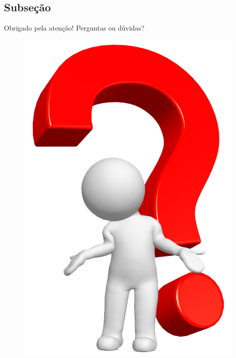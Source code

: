 \documentclass{beamer}
\begin{document}
\subsection{Subseção}
\begin{frame}
\begin{block}{}
\justify \center Obrigado pela atenção!
\center \alert{Perguntas ou dúvidas?}
\end{block}
\begin{figure}[h]
\centering
\includegraphics[scale=0.15]{figs/questions.png}
\end{figure}	
\end{frame}
\end{document}
